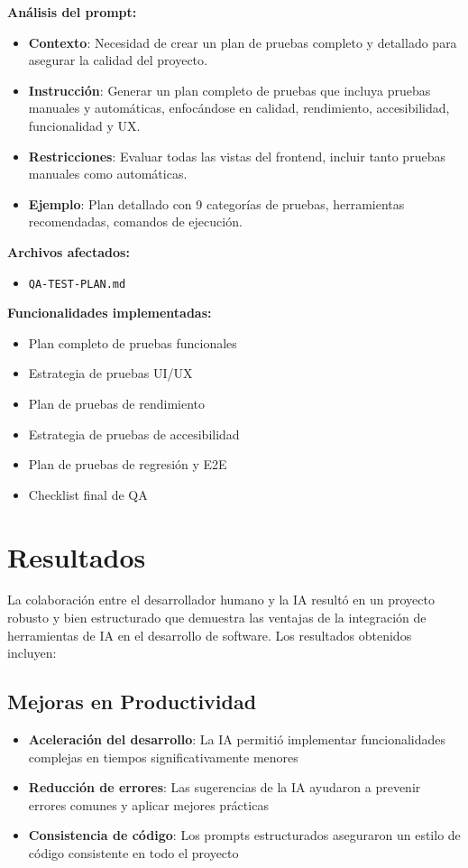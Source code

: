 \documentclass[12pt,a4paper]{article}
\begin{document}
\textbf{Análisis del prompt:}
\begin{itemize}
    \item \textbf{Contexto}: Necesidad de crear un plan de pruebas completo y detallado para asegurar la calidad del proyecto.
    \item \textbf{Instrucción}: Generar un plan completo de pruebas que incluya pruebas manuales y automáticas, enfocándose en calidad, rendimiento, accesibilidad, funcionalidad y UX.
    \item \textbf{Restricciones}: Evaluar todas las vistas del frontend, incluir tanto pruebas manuales como automáticas.
    \item \textbf{Ejemplo}: Plan detallado con 9 categorías de pruebas, herramientas recomendadas, comandos de ejecución.
\end{itemize}

\textbf{Archivos afectados:}
\begin{itemize}
    \item \texttt{QA-TEST-PLAN.md}
\end{itemize}

\textbf{Funcionalidades implementadas:}
\begin{itemize}
    \item Plan completo de pruebas funcionales
    \item Estrategia de pruebas UI/UX
    \item Plan de pruebas de rendimiento
    \item Estrategia de pruebas de accesibilidad
    \item Plan de pruebas de regresión y E2E
    \item Checklist final de QA
\end{itemize}

\section{Resultados}

La colaboración entre el desarrollador humano y la IA resultó en un proyecto robusto y bien estructurado que demuestra las ventajas de la integración de herramientas de IA en el desarrollo de software. Los resultados obtenidos incluyen:

\subsection{Mejoras en Productividad}

\begin{itemize}
    \item \textbf{Aceleración del desarrollo}: La IA permitió implementar funcionalidades complejas en tiempos significativamente menores
    \item \textbf{Reducción de errores}: Las sugerencias de la IA ayudaron a prevenir errores comunes y aplicar mejores prácticas
    \item \textbf{Consistencia de código}: Los prompts estructurados aseguraron un estilo de código consistente en todo el proyecto
\end{itemize}
\end{document}
